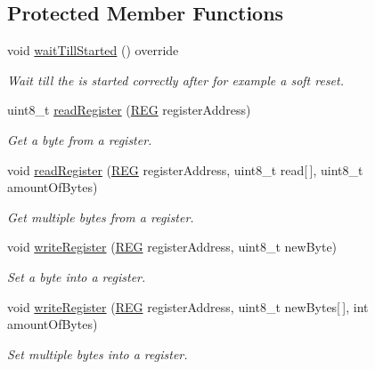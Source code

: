 \subsection*{Protected Member Functions}
\begin{DoxyCompactItemize}
\item 
\mbox{\label{class_m_f_r_c522_a6bfefd877c6060dde4eff2c25b7f96f2}} 
void \mbox{\hyperlink{class_m_f_r_c522_a6bfefd877c6060dde4eff2c25b7f96f2}{wait\+Till\+Started}} () override
\begin{DoxyCompactList}\small\item\em Wait till the is started correctly after for example a soft reset. \end{DoxyCompactList}\item 
uint8\+\_\+t \mbox{\hyperlink{class_m_f_r_c522_afe0e86db047ef36af49349e7fdc7fa65}{read\+Register}} (\mbox{\hyperlink{class_m_f_r_c522_ae7ec09eb8c9c61288a4770175b4b8db7}{R\+EG}} register\+Address)
\begin{DoxyCompactList}\small\item\em Get a byte from a register. \end{DoxyCompactList}\item 
void \mbox{\hyperlink{class_m_f_r_c522_a559408e38c2c8fea3316f6e2b4477b81}{read\+Register}} (\mbox{\hyperlink{class_m_f_r_c522_ae7ec09eb8c9c61288a4770175b4b8db7}{R\+EG}} register\+Address, uint8\+\_\+t read\mbox{[}$\,$\mbox{]}, uint8\+\_\+t amount\+Of\+Bytes)
\begin{DoxyCompactList}\small\item\em Get multiple bytes from a register. \end{DoxyCompactList}\item 
void \mbox{\hyperlink{class_m_f_r_c522_aa976c78dde5b2dfbbd5bcbedaad14a7a}{write\+Register}} (\mbox{\hyperlink{class_m_f_r_c522_ae7ec09eb8c9c61288a4770175b4b8db7}{R\+EG}} register\+Address, uint8\+\_\+t new\+Byte)
\begin{DoxyCompactList}\small\item\em Set a byte into a register. \end{DoxyCompactList}\item 
void \mbox{\hyperlink{class_m_f_r_c522_a3558d379575863072c711721b061bb75}{write\+Register}} (\mbox{\hyperlink{class_m_f_r_c522_ae7ec09eb8c9c61288a4770175b4b8db7}{R\+EG}} register\+Address, uint8\+\_\+t new\+Bytes\mbox{[}$\,$\mbox{]}, int amount\+Of\+Bytes)
\begin{DoxyCompactList}\small\item\em Set multiple bytes into a register. \end{DoxyCompactList}\item 

\end{DoxyCompactItemize}
